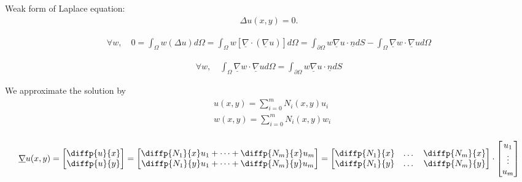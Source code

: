 \documentclass{book}
\begin{document}
Weak form of Laplace equation:
\begin{align}
    \Delta u(x,y) = 0.
\end{align}

\begin{align*}
    \forall w, \quad 0 = \int_{\Omega} w(\Delta u) d\Omega = \int_{\Omega} w [\underline{\nabla} \cdot (\underline{\nabla} u)] d\Omega = \int_{\partial\Omega} w \underline{\nabla} u \cdot \underline{n} dS - \int_{\Omega} \underline{\nabla}w \cdot \underline{\nabla}u d\Omega
\end{align*}


\begin{align*}
    \forall w, \quad \int_{\Omega} \underline{\nabla}w \cdot \underline{\nabla}u d\Omega = \int_{\partial\Omega} w \underline{\nabla} u \cdot \underline{n} dS
\end{align*}


We approximate the solution by
\begin{align*}
    & u(x, y) = \sum_{i = 0}^m N_i(x, y) u_i \\
    & w(x, y) = \sum_{i = 0}^m N_i(x, y) w_i \\
\end{align*}

\begin{align*}
    \underline{\nabla} u(x, y) = \begin{bmatrix}
        \diffp{u}{x} \\
        \diffp{u}{y} \\
        \end{bmatrix}
        = 
        \begin{bmatrix}
            \diffp{N_1}{x}u_1 + \dots + \diffp{N_m}{x}u_m \\
            \diffp{N_1}{y}u_1 + \dots + \diffp{N_m}{y}u_m \\
        \end{bmatrix}
        =
        \begin{bmatrix}
            \diffp{N_1}{x} & \dots & \diffp{N_m}{x} \\
            \diffp{N_1}{y} & \dots & \diffp{N_m}{y} 
        \end{bmatrix} \cdot \begin{bmatrix}
            u_1 \\
            \vdots \\
            u_m 
        \end{bmatrix}
\end{align*}
\end{document}
